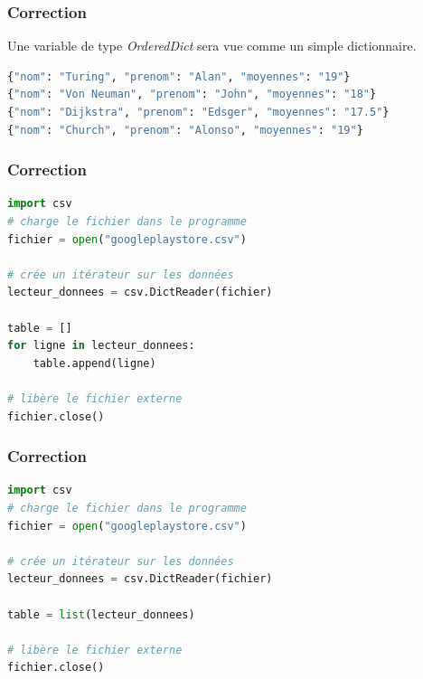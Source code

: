 \documentclass[svgnames,11pt]{beamer}
\begin{document}
\begin{frame}[fragile]
    \frametitle{Correction}

    \begin{aretenir}[Commentaire]
        Une variable de type \emph{OrderedDict} sera vue comme un simple dictionnaire.
    \end{aretenir}
    \begin{center}
        \begin{lstlisting}[language=Python, xleftmargin=0.3em,xrightmargin=0.5em,basicstyle=\small]
{"nom": "Turing", "prenom": "Alan", "moyennes": "19"}
{"nom": "Von Neuman", "prenom": "John", "moyennes": "18"}
{"nom": "Dijkstra", "prenom": "Edsger", "moyennes": "17.5"}
{"nom": "Church", "prenom": "Alonso", "moyennes": "19"}

\end{lstlisting}
        \label{CODE}
    \end{center}
\end{frame}

\begin{frame}[fragile]
    \frametitle{Correction}

    \begin{center}
        \begin{lstlisting}[language=Python]
import csv
# charge le fichier dans le programme
fichier = open("googleplaystore.csv")

# crée un itérateur sur les données
lecteur_donnees = csv.DictReader(fichier)

table = []
for ligne in lecteur_donnees:
    table.append(ligne)

# libère le fichier externe
fichier.close()
\end{lstlisting}
        \label{CODE}
    \end{center}

\end{frame}

\begin{frame}[fragile]
    \frametitle{Correction}

    \begin{center}
        \begin{lstlisting}[language=Python]
import csv
# charge le fichier dans le programme
fichier = open("googleplaystore.csv")

# crée un itérateur sur les données
lecteur_donnees = csv.DictReader(fichier)

table = list(lecteur_donnees)

# libère le fichier externe
fichier.close()
\end{lstlisting}
        \label{CODE}
    \end{center}

\end{frame}
\end{document}

